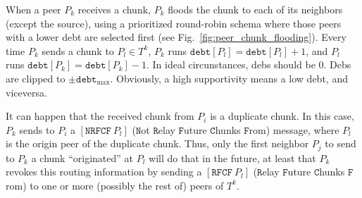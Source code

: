 \label{sec:chunk_flooding}
\begin{figure*}
  \caption{Chunk flooding at peers.\label{fig:peer_chunk_flooding}}
\end{figure*}
When a peer $P_k$ receives a chunk, $P_k$ floods the chunk to each of
its neighbors (except the source), using a prioritized round-robin
schema where those peers with a lower debt are selected first (see
Fig.~\ref{fig:peer_chunk_flooding}). Every time $P_k$ sends a chunk to
$P_l\in T^k$, $P_k$ runs $\mathtt{debt}[P_l] = \mathtt{debt}[P_l]+1$,
and $P_l$ runs $\mathtt{debt}[P_k] = \mathtt{debt}[P_k]-1$. In ideal
circunstances, debs should be $0$. Debs are clipped to
$\pm\mathtt{debt}_{\text{max}}$. Obviously, a high supportivity means
a low debt, and viceversa.

It can happen that the received chunk from $P_i$ is a duplicate
chunk. In this case, $P_k$ sends to $P_i$ a $[\mathtt{NRFCF}~P_l]$
($\mathtt{N}$ot $\mathtt{R}$elay $\mathtt{F}$uture $\mathtt{C}$hunks
$\mathtt{F}$rom) message, where $P_l$ is the origin peer of the
duplicate chunk. Thus, only the first neighbor $P_j$ to send to $P_k$
a chunk ``originated'' at $P_l$ will do that in the future, at least
that $P_k$ revokes this routing information by sending a
$[\mathtt{RFCF}~P_l]$ ($\mathtt{R}$elay $\mathtt{F}$uture
$\mathtt{C}$hunks $\mathtt{F}$rom) to one or more (possibly the rest
of) peers of $T^k$.

\begin{comment}
In each round, peers check if a chunk have been received from the rest
of peers of the team (${\cal P}_k\in {\cal T}_j)$). If not, peers send
a $[\mathtt{propagate}~{\cal P}_i]$ to one or more (possibly
to the rest of) peers of the team, where ${\cal P}_i$ is the origin peer
of the missing chunk. At this point, the process continues as
described in Section~\ref{dbs:chunk_flooding}.
\end{comment}

\begin{comment}
For each ${\cal P}_k\in N({\cal P}_i)$, ${\cal P}_i$ checks if a chunk
has been received from ${\cal P}_k$. If ${\cal P}_i$ detects that
${\cal P}_k$ has not sent a chunk to it during $L$ consecutive rounds,
performs $N({\cal P}_i) = N({\cal P}_i)\setminus{\cal P}_k$, and stops
sending to ${\cal P}_k$ more chunks.
\end{comment}
\begin{comment}
computes a
``chunk-debt'', denoted by $d({\cal P}_k)$, that is incremented each
time a chunk is received from ${\cal P}_k$ and decremented each time a
chunk is sent to ${\cal P}_k$. If ${\cal P}_i$ verifies that $d({\cal
  P}_k)>D$ (the maximum debt), then ${\cal P}_i$ considers that ${\cal
  P}_k$ is unable to communicate with it, performs $N({\cal P}_i) =
N({\cal P}_i)\setminus{\cal P}_k$, and stops sending to ${\cal P}_k$
more chunks.
\end{comment}


